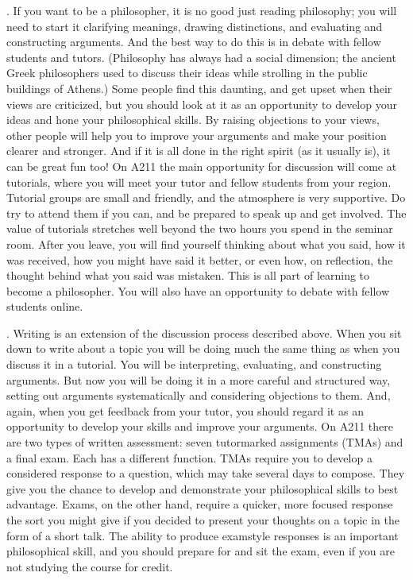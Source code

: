 \documentclass[letterpaper,10pt,english]{sphinxmanual}
\begin{document}
. If you want to be a philosopher, it is no good just reading philosophy; you will need to start  it \textendash{} clarifying meanings, drawing distinctions, and evaluating and constructing arguments. And the best way to do this is in debate with fellow students and tutors. (Philosophy has always had a social dimension; the ancient Greek philosophers used to discuss their ideas while strolling in the public buildings of Athens.) Some people find this daunting, and get upset when their
views are criticized, but you should look at it as an opportunity to develop your ideas and hone your philosophical skills. By raising objections to your views, other people will help you to improve your arguments and make your position clearer and stronger. And if it is all done in the right spirit (as it usually is), it can be great fun too! On A211 the main opportunity for discussion will come at tutorials, where you will meet your tutor and fellow students from your region. Tutorial groups
are small and friendly, and the atmosphere is very supportive. Do try to attend them if you can, and be prepared to speak up and get involved. The value of tutorials stretches well beyond the two hours you spend in the seminar room. After you leave, you will find yourself thinking about what you said, how it was received, how you might have said it better, or even how, on reflection, the thought behind what you said was mistaken. This is all part of learning to become a philosopher. You will
also have an opportunity to debate with fellow students online.

. Writing is an extension of the discussion process described above. When you sit down to write about a topic you will be doing much the same thing as when you discuss it in a tutorial. You will be interpreting, evaluating, and constructing arguments. But now you will be doing it in a more careful and structured way, setting out arguments systematically and considering objections to them. And, again, when you get feedback from your tutor, you should regard it as an opportunity to
develop your skills and improve your arguments. On A211 there are two types of written assessment: seven tutor\sphinxhyphen{}marked assignments (TMAs) and a final exam. Each has a different function. TMAs require you to develop a considered response to a question, which may take several days to compose. They give you the chance to develop and demonstrate your philosophical skills to best advantage. Exams, on the other hand, require a quicker, more focused response \textendash{} the sort you might give if you decided to
present your thoughts on a topic in the form of a short talk. The ability to produce exam\sphinxhyphen{}style responses is an important philosophical skill, and you should prepare for and sit the exam, even if you are not studying the course for credit.
\end{document}

